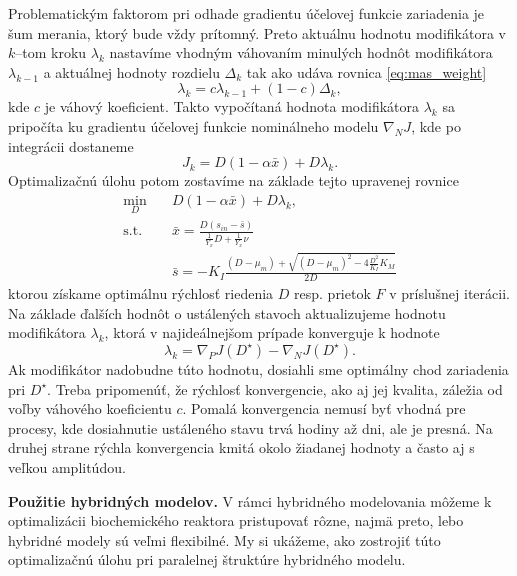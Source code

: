 Problematickým faktorom pri odhade gradientu účelovej funkcie zariadenia je šum merania, ktorý bude vždy prítomný. Preto aktuálnu hodnotu modifikátora v $ k $--tom kroku $ \lambda_k $ nastavíme vhodným váhovaním minulých hodnôt modifikátora $ \lambda_{k-1} $ a aktuálnej hodnoty rozdielu $ \Delta_{k} $ tak ako udáva rovnica \eqref{eq:mas_weight}
\begin{equation*}
	\lambda_k = c\lambda_{k-1} + \left(1 - c\right)\Delta_{k},
\end{equation*}
kde $ c $ je váhový koeficient. Takto vypočítaná hodnota modifikátora $ \lambda_k $ sa pripočíta ku gradientu účelovej funkcie nominálneho modelu $ \nabla_{N}J $, kde po integrácii dostaneme
\begin{equation}
	J_{k} = D\left(1-\alpha\bar{x}\right) + D\lambda_k.
\end{equation}
Optimalizačnú úlohu potom zostavíme na základe tejto upravenej rovnice
\begin{equation}
	\begin{split}
		\min_{D} &\quad D\left(1-\alpha\bar{x}\right) + D\lambda_k, \\
		\text{s.t.} &\quad \bar{x} = \frac{D\left(s_{in}-\bar{s}\right)}{\frac{1}{Y_{x}}D + \frac{1}{Y_{x}}\nu} \\
		&\quad \bar{s} = -K_{I}\frac{\left(D-\mu_{m}\right) + \sqrt{\left(D-\mu_{m}\right)^2 - 4\frac{D^2}{K_{I}}K_{M}}}{2D}
	\end{split}
\end{equation}
ktorou získame optimálnu rýchlosť riedenia $ D $ resp. prietok $ F $ v príslušnej iterácii. Na základe ďalších hodnôt o ustálených stavoch aktualizujeme hodnotu modifikátora $ \lambda_k $, ktorá v najideálnejšom prípade konverguje k hodnote
\begin{equation}
	\lambda_k = \nabla_{P}J\left(D^{\star}\right) - \nabla_{N}J\left(D^{\star}\right).
\end{equation} 
Ak modifikátor nadobudne túto hodnotu, dosiahli sme optimálny chod zariadenia pri $ D^{\star} $. Treba pripomenúť, že rýchlosť konvergencie, ako aj jej kvalita, záležia od voľby váhového koeficientu $ c $. Pomalá konvergencia nemusí byť vhodná pre procesy, kde dosiahnutie ustáleného stavu trvá hodiny až dni, ale je presná. Na druhej strane rýchla konvergencia kmitá okolo žiadanej hodnoty a často aj s veľkou amplitúdou.

\textbf{Použitie hybridných modelov.}
V rámci hybridného modelovania môžeme k optimalizácii biochemického reaktora pristupovať rôzne, najmä preto, lebo hybridné modely sú veľmi flexibilné. My si ukážeme, ako zostrojiť túto optimalizačnú úlohu pri paralelnej štruktúre hybridného modelu.

